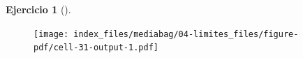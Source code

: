\documentclass[
  a4paper,
]{scrreport}
\newenvironment{Shaded}{\begin{snugshade}}{\end{snugshade}}
\newcommand{\FloatTok}[1]{\textcolor[rgb]{0.68,0.00,0.00}{#1}}
\newcommand{\FunctionTok}[1]{\textcolor[rgb]{0.28,0.35,0.67}{#1}}
\newcommand{\NormalTok}[1]{\textcolor[rgb]{0.00,0.23,0.31}{#1}}
\newcommand{\OperatorTok}[1]{\textcolor[rgb]{0.37,0.37,0.37}{#1}}
\newcommand{\SpecialCharTok}[1]{\textcolor[rgb]{0.37,0.37,0.37}{#1}}
\newcommand{\StringTok}[1]{\textcolor[rgb]{0.13,0.47,0.30}{#1}}
\theoremstyle{definition}
\newtheorem{exercise}{Ejercicio}[chapter]
\theoremstyle{remark}
\begin{document}
\begin{exercise}[]
\begin{enumerate}
\begin{tcolorbox}
\begin{Shaded}
\end{Shaded}

  \begin{figure}[H]

  {\centering \texttt{[image: index\_files/mediabag/04-limites\_files/figure-pdf/cell-31-output-1.pdf]}

  }

  \end{figure}

  \end{tcolorbox}
\end{enumerate}

\end{exercise}
\end{document}

